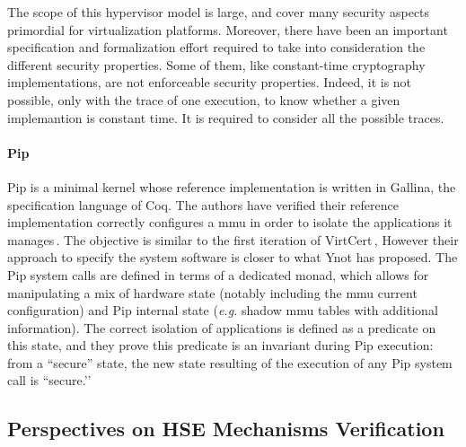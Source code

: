 The scope of this hypervisor model is large, and cover many security aspects
primordial for virtualization platforms.
%
Moreover, there have been an important specification and formalization effort
required to take into consideration the different security properties.
%
Some of them, like constant-time cryptography implementations, are not
enforceable security properties.
%
Indeed, it is not possible, only with the trace of one execution, to know
whether a given implemantion is constant time.
%
It is required to consider all the possible traces.

\paragraph{Pip}
%
Pip is a minimal kernel whose reference implementation is written in {\sc
  Gallina}, the specification language of Coq.
%
The authors have verified their reference implementation correctly configures a
\ac{mmu} in order to isolate the applications it manages\,\cite{jomaa2016mmu}.
%
The objective is similar to the first iteration of
VirtCert\,\cite{barthe2011virtcert1}, However their approach to specify the
system software is closer to what Ynot has proposed.
%
The Pip system calls are defined in terms of a dedicated monad, which allows for
manipulating a mix of hardware state (notably including the \ac{mmu} current
configuration) and Pip internal state (\emph{e.g.} shadow \ac{mmu} tables with
additional information).
%
The correct isolation of applications is defined as a predicate on this state,
and they prove this predicate is an invariant during Pip execution:
%
from a ``secure'' state, the new state resulting of the execution of any Pip
system call is ``secure.’’

\subsection{Perspectives on HSE Mechanisms Verification}


